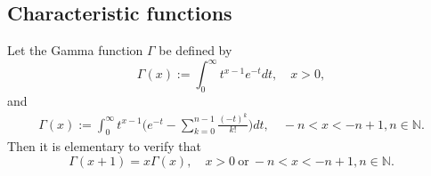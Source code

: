 \documentclass[12pt, a4paper]{amsart}
\theoremstyle{definition}
\numberwithin{equation}{section}
\begin{document}
\subsection{Characteristic functions}
    Let the Gamma function $\Gamma$ be defined by
\begin{equation}
    \Gamma (x) := \int_0^\infty t^{x-1} e^{-t}dt,
    \quad x>0,
\end{equation}
and
\begin{align}
\label{eq: definition of Gamma function}
    \Gamma(x)
    := \int_0^\infty t^{x-1} \Big(e^{-t} - \sum_{k=0}^{n-1} \frac{(-t)^k}{k!}\Big) dt,
    \quad -n< x< -n+1, n\in \mathbb N.
\end{align}
    Then it is elementary to verify that
\begin{equation}
    \Gamma(x+1) = x\Gamma(x),
    \quad x>0~\text{or}~-n< x< -n+1, n\in \mathbb N.
\end{equation}
\end{document}
